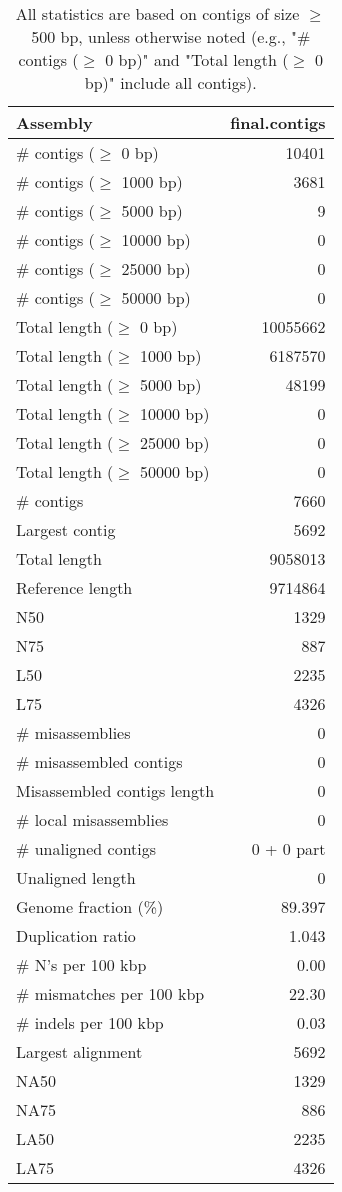 \documentclass[12pt,a4paper]{article}
\begin{document}
\begin{table}[ht]
\begin{center}
\caption{All statistics are based on contigs of size $\geq$ 500 bp, unless otherwise noted (e.g., "\# contigs ($\geq$ 0 bp)" and "Total length ($\geq$ 0 bp)" include all contigs).}
\begin{tabular}{|l*{1}{|r}|}
\hline
Assembly & final.contigs \\ \hline
\# contigs ($\geq$ 0 bp) & 10401 \\ \hline
\# contigs ($\geq$ 1000 bp) & 3681 \\ \hline
\# contigs ($\geq$ 5000 bp) & 9 \\ \hline
\# contigs ($\geq$ 10000 bp) & 0 \\ \hline
\# contigs ($\geq$ 25000 bp) & 0 \\ \hline
\# contigs ($\geq$ 50000 bp) & 0 \\ \hline
Total length ($\geq$ 0 bp) & 10055662 \\ \hline
Total length ($\geq$ 1000 bp) & 6187570 \\ \hline
Total length ($\geq$ 5000 bp) & 48199 \\ \hline
Total length ($\geq$ 10000 bp) & 0 \\ \hline
Total length ($\geq$ 25000 bp) & 0 \\ \hline
Total length ($\geq$ 50000 bp) & 0 \\ \hline
\# contigs & 7660 \\ \hline
Largest contig & 5692 \\ \hline
Total length & 9058013 \\ \hline
Reference length & 9714864 \\ \hline
N50 & 1329 \\ \hline
N75 & 887 \\ \hline
L50 & 2235 \\ \hline
L75 & 4326 \\ \hline
\# misassemblies & 0 \\ \hline
\# misassembled contigs & 0 \\ \hline
Misassembled contigs length & 0 \\ \hline
\# local misassemblies & 0 \\ \hline
\# unaligned contigs & 0 + 0 part \\ \hline
Unaligned length & 0 \\ \hline
Genome fraction (\%) & 89.397 \\ \hline
Duplication ratio & 1.043 \\ \hline
\# N's per 100 kbp & 0.00 \\ \hline
\# mismatches per 100 kbp & 22.30 \\ \hline
\# indels per 100 kbp & 0.03 \\ \hline
Largest alignment & 5692 \\ \hline
NA50 & 1329 \\ \hline
NA75 & 886 \\ \hline
LA50 & 2235 \\ \hline
LA75 & 4326 \\ \hline
\end{tabular}
\end{center}
\end{table}
\end{document}
